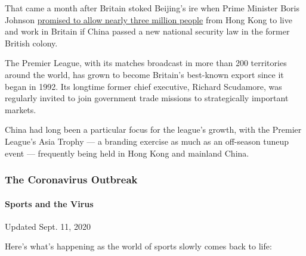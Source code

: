 That came a month after Britain stoked Beijing's ire when Prime Minister
Boris Johnson
\href{https://www.nytimes3xbfgragh.onion/2020/06/03/world/europe/boris-johnson-uk-hong-kong-china.html}{promised
to allow nearly three million people} from Hong Kong to live and work in
Britain if China passed a new national security law in the former
British colony.

The Premier League, with its matches broadcast in more than 200
territories around the world, has grown to become Britain's best-known
export since it began in 1992. Its longtime former chief executive,
Richard Scudamore, was regularly invited to join government trade
missions to strategically important markets.

China had long been a particular focus for the league's growth, with the
Premier League's Asia Trophy --- a branding exercise as much as an
off-season tuneup event --- frequently being held in Hong Kong and
mainland China.

\hypertarget{the-coronavirus-outbreak}{%
\subsubsection{The Coronavirus
Outbreak}\label{the-coronavirus-outbreak}}

\hypertarget{sports-and-the-virus}{%
\paragraph{Sports and the Virus}\label{sports-and-the-virus}}

Updated Sept. 11, 2020

Here's what's happening as the world of sports slowly comes back to
life:


